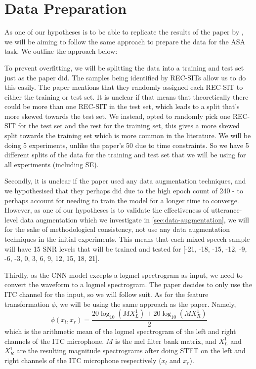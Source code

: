 \documentclass[logo,bsc,singlespacing,parskip,online]{infthesis}
\begin{document}
\section{Data Preparation}
\label{sec:data-preparation}
As one of our hypotheses is to be able to replicate the results of the paper by \citet{Huwel2020HearDS}, 
we will be aiming to follow the same approach to prepare the data for the ASA task.
We outline the approach below:

To prevent overfitting, we will be splitting the data into a training and test set just as the paper did.
The samples being identified by REC-SITs allow us to do this easily. The paper mentions that they randomly 
assigned each REC-SIT to either the training or test set. It is unclear if 
that means that theoretically there could be more than one REC-SIT in the test set, which 
leads to a split that's more skewed towards the test set. We instead, opted to randomly pick 
one REC-SIT for the test set and the rest for the training set, this gives a more 
skewed split towards the training set which is more common in the literature.
We will be doing 5 experiments, unlike the paper's 50 due to time constraints. So 
we have 5 different splits of the data for the training and test set that we will be using 
for all experiments (including SE).

Secondly, it is unclear if the paper used any data augmentation techniques, and we 
hypothesised that they perhaps did due to the high epoch count of 240 - to perhaps 
account for needing to train the model for a longer time to converge. However,
as one of our hypotheses is to validate the effectiveness of utterance-level data 
augmentation which we investigate in \ref{sec:data-augmentation}, we will 
for the sake of methodological consistency, not use any data augmentation techniques in the 
initial experiments. This means that each mixed speech sample will have 15
SNR levels that will be trained and tested for [-21, -18, -15, -12, -9, -6, -3, 0, 3, 6, 9, 12, 15, 18, 21].

Thirdly, as the CNN model excepts a logmel spectrogram as input, we need to convert the waveform
to a logmel spectrogram. The paper decides to only use the ITC channel for the input, so we 
will follow suit.
As for the feature transformation \(\phi\), we will be using the same approach as the paper. Namely, 
\begin{equation}
\phi(x_l, x_r) = \frac{20\log_{10}\left(M X_{L}^{1} \right) + 20\log_{10}\left(M X_{R}^{1}\right)}{2}
\label{eq:logmel}
\end{equation}
which is the arithmetic mean of the logmel spectrogram of the left and right channels of the ITC microphone.
$M$ is the mel filter bank matrix, and $X_{L}^{1}$ and $X_{R}^{1}$ are
the resulting magnitude spectrograms after doing STFT on the left and right channels of the ITC microphone respectively ($x_l$ and $x_r$).
\end{document}
